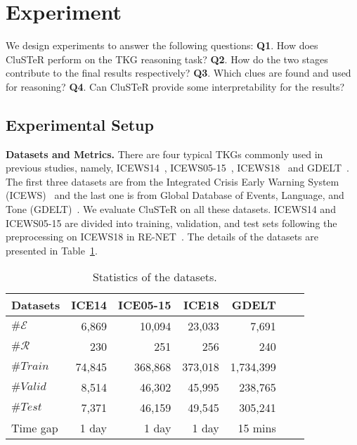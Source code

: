 \documentclass[11pt,a4paper]{article}
\begin{document}
\section{Experiment}
We design experiments to answer the following questions: \textbf{Q1}. How does
CluSTeR perform on the TKG reasoning task? \textbf{Q2}. How do the two
stages contribute to the final results respectively? \textbf{Q3}. Which clues are
found and used for reasoning? \textbf{Q4}. Can CluSTeR provide some
interpretability for the results? 

\subsection{Experimental Setup} \label{metrics}
{\bf Datasets and Metrics.} There are four typical TKGs commonly used in
previous studies, namely, ICEWS14~\cite{garcia2018learning},
ICEWS05-15~\cite{garcia2018learning}, ICEWS18~\cite{jin2019recurrent} and
GDELT~\cite{jin2020Renet}. The first three datasets are from the Integrated
Crisis Early Warning System (ICEWS)~\cite{boschee2015icews} and the last one is
from Global Database of Events, Language, and Tone
(GDELT)~\cite{leetaru2013gdelt}. We evaluate CluSTeR on all these datasets.
ICEWS14 and ICEWS05-15 are divided into training, validation, and test sets
following the preprocessing on ICEWS18 in RE-NET~\cite{jin2020Renet}. The
details of the datasets are presented in Table~\ref{table:datasets}.

\begin{table}
\small
\centering
\begin{tabular}{lrrrrrr}
\toprule
Datasets           &ICE14   &ICE05-15  &ICE18  &GDELT\\
\midrule
$\#\mathcal{E}$              &6,869    &10,094  &23,033   &7,691\\
$\#\mathcal{R}$               &230     &251   &256     &240 \\
$\#{Train}$     &74,845   &368,868  &373,018  &1,734,399\\
$\#{Valid}$      &8,514    &46,302  &45,995   &238,765\\
$\#{Test}$      &7,371    &46,159  &49,545    &305,241\\
Time gap         &1 day   &1 day   &1 day  &15 mins\\

\bottomrule
\end{tabular}
\vspace{-2mm}
\caption{Statistics of the datasets.}
\vspace{-6mm}
\label{table:datasets}
\end{table}
\end{document}
